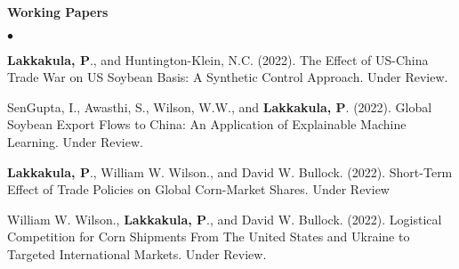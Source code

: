 \documentclass[margin,line]{res}
\newenvironment{list2}{
  \begin{list}{$\bullet$}{%
    \setlength{\itemsep}{0in}
    \setlength{\parsep}{0in} \setlength{\parskip}{0in}
    \setlength{\topsep}{0in} \setlength{\partopsep}{0in}
    \setlength{\leftmargin}{0.2in}}}{\end{list}}
\begin{document}
\begin{resume}
{\bf Working Papers}
\\
\begin{list2}
\item {\bf Lakkakula, P}., and Huntington-Klein, N.C. (2022). The Effect of US-China Trade War on US Soybean Basis: A Synthetic Control Approach. Under Review.

\item SenGupta, I., Awasthi, S., Wilson, W.W., and {\bf Lakkakula, P}. (2022). Global Soybean Export Flows to China: An Application of Explainable Machine Learning. Under Review.
\item {\bf Lakkakula, P}., William W. Wilson., and David W. Bullock. (2022). Short-Term Effect of Trade Policies on Global Corn-Market Shares. Under Review
\item William W. Wilson., {\bf Lakkakula, P}., and David W. Bullock. (2022). Logistical Competition for Corn Shipments From The United States and Ukraine to Targeted International Markets. Under Review.


\end{list2}
\end{resume}
\end{document}
